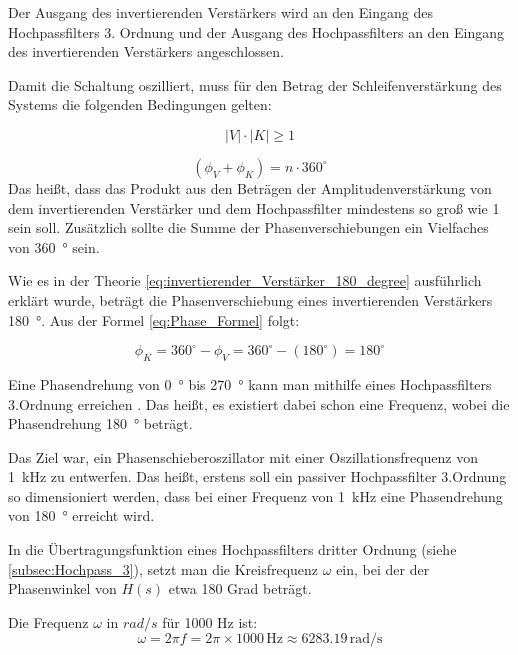 Der Ausgang des invertierenden Verstärkers wird an den Eingang des Hochpassfilters 3. Ordnung und der Ausgang des Hochpassfilters an den Eingang des invertierenden Verstärkers angeschlossen.

Damit die Schaltung oszilliert, muss für den Betrag der Schleifenverstärkung des Systems die folgenden Bedingungen \cite{Skript} gelten:

\begin{equation}
|V| \cdot |K| \geq 1
\end{equation}

\begin{equation}
\label{eq:Phase_Formel}
(\phi_V + \phi_K) = n \cdot 360^\circ
\end{equation}
Das heißt, dass das Produkt aus den Beträgen der Amplitudenverstärkung von dem invertierenden Verstärker und dem Hochpassfilter mindestens so groß wie 1 sein soll. Zusätzlich sollte die Summe der Phasenverschiebungen ein Vielfaches von \SI{360}{\degree} sein.

Wie es in der Theorie \ref{eq:invertierender_Verstärker_180_degree} ausführlich erklärt wurde, beträgt die Phasenverschiebung eines invertierenden Verstärkers \SI{180}{\degree}. Aus der Formel \ref{eq:Phase_Formel} folgt:

\begin{equation*}
 \phi_K = 360^\circ - \phi_V = 360^\circ -(180^\circ)=180^\circ
\end{equation*}

Eine Phasendrehung von \SI{0}{\degree} bis \SI{270}{\degree} kann man mithilfe eines Hochpassfilters 3.Ordnung erreichen . Das heißt, es existiert dabei schon eine Frequenz, wobei die Phasendrehung \SI{180}{\degree} beträgt. 

Das Ziel war, ein Phasenschieberoszillator mit einer Oszillationsfrequenz von \SI{1}{\kilo\hertz} zu entwerfen. Das heißt, erstens soll ein passiver Hochpassfilter 3.Ordnung so dimensioniert werden, dass bei einer Frequenz von \SI{1}{\kilo\hertz} eine Phasendrehung von \SI{180}{\degree} erreicht wird.

In die Übertragungsfunktion eines Hochpassfilters dritter Ordnung (siehe \ref{subsec:Hochpass_3}), setzt  man die Kreisfrequenz \(\omega\) ein, bei der der Phasenwinkel von \(H(s)\) etwa 180 Grad beträgt.

Die Frequenz \(\omega\) in $rad/s$ für 1000 Hz ist:
\begin{equation}
\omega = 2 \pi f = 2 \pi \times 1000 \, \text{Hz} \approx 6283.19 \, \text{rad/s}
\end{equation}

